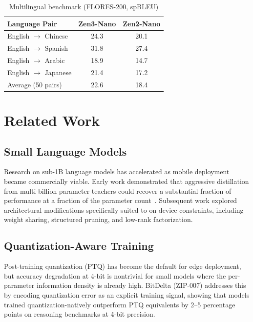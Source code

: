 \documentclass[11pt,a4paper]{article}
\begin{document}
\begin{table}[H]
\centering
\caption{Multilingual benchmark (FLORES-200, spBLEU)}
\begin{tabular}{lcc}
\toprule
\textbf{Language Pair} & \textbf{Zen3-Nano} & \textbf{Zen2-Nano} \\
\midrule
English $\to$ Chinese   & 24.3 & 20.1 \\
English $\to$ Spanish   & 31.8 & 27.4 \\
English $\to$ Arabic    & 18.9 & 14.7 \\
English $\to$ Japanese  & 21.4 & 17.2 \\
Average (50 pairs)      & 22.6 & 18.4 \\
\bottomrule
\end{tabular}
\label{tab:multilingual}
\end{table}

\section{Related Work}
\label{sec:related}

\subsection{Small Language Models}

Research on sub-1B language models has accelerated as mobile deployment became
commercially viable. Early work demonstrated that aggressive distillation from
multi-billion parameter teachers could recover a substantial fraction of performance
at a fraction of the parameter count~\cite{hinton2015distilling}. Subsequent work
explored architectural modifications specifically suited to on-device constraints,
including weight sharing, structured pruning, and low-rank factorization.

\subsection{Quantization-Aware Training}

Post-training quantization (PTQ) has become the default for edge deployment, but
accuracy degradation at 4-bit is nontrivial for small models where the per-parameter
information density is already high. BitDelta (ZIP-007) addresses this by encoding
quantization error as an explicit training signal, showing that models trained
quantization-natively outperform PTQ equivalents by 2--5 percentage points on
reasoning benchmarks at 4-bit precision.
\end{document}
